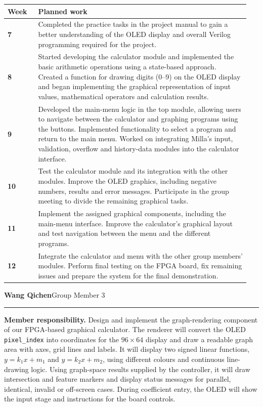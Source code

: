 \documentclass[10pt,a4paper]{article}
\makeatletter
\newcommand{\member}[2]{%
  \vspace{2pt}%
  {\bfseries\large #1}\hfill{\small #2}\par
  \vspace{1pt}\hrule\vspace{3pt}%
}
\newcommand{\role}{\textbf{Member responsibility.} }
\newenvironment{timeline}{%
  \vspace{2pt}%
  \begin{tabular}{@{}>{\bfseries}p{0.12\linewidth}p{0.83\linewidth}@{}}%
  \hline
  Week & \textbf{Planned work}\\
  \hline
}{%
  \hline
  \end{tabular}%
  \vspace{2pt}%
}
\newcommand{\wk}[2]{#1 & #2\\}
\makeatother
\begin{document}
\begin{timeline}
\wk{7}{Completed the practice tasks in the project manual to gain a better
understanding of the OLED display and overall Verilog programming required for
the project.}

\wk{8}{Started developing the calculator module and implemented the basic
arithmetic operations using a state-based approach. Created a function for
drawing digits (0--9) on the OLED display and began implementing the graphical
representation of input values, mathematical operators and calculation results.}

\wk{9}{Developed the main-menu logic in the top module, allowing users to
navigate between the calculator and graphing programs using the buttons.
Implemented functionality to select a program and return to the main menu.
Worked on integrating Milla's input, validation, overflow and history-data
modules into the calculator interface.}

\wk{10}{Test the calculator module and its integration with the other modules.
Improve the OLED graphics, including negative numbers, results and error
messages. Participate in the group meeting to divide the remaining graphical
tasks.}

\wk{11}{Implement the assigned graphical components, including the main-menu
interface. Improve the calculator's graphical layout and test navigation
between the menu and the different programs.}

\wk{12}{Integrate the calculator and menu with the other group members' modules.
Perform final testing on the FPGA board, fix remaining issues and prepare the
system for the final demonstration.}
\end{timeline}

\newpage

\member{Wang Qichen}{Group Member 3}
\role
Design and implement the graph-rendering component of our FPGA-based graphical
calculator. The renderer will convert the OLED \texttt{pixel\_index} into
coordinates for the $96\times64$ display and draw a readable graph area with
axes, grid lines and labels. It will display two signed linear functions,
$y=k_1x+m_1$ and $y=k_2x+m_2$, using different colours and continuous
line-drawing logic. Using graph-space results supplied by the controller, it
will draw intersection and feature markers and display status messages for
parallel, identical, invalid or off-screen cases. During coefficient entry, the
OLED will show the input stage and instructions for the board
controls.
\end{document}
